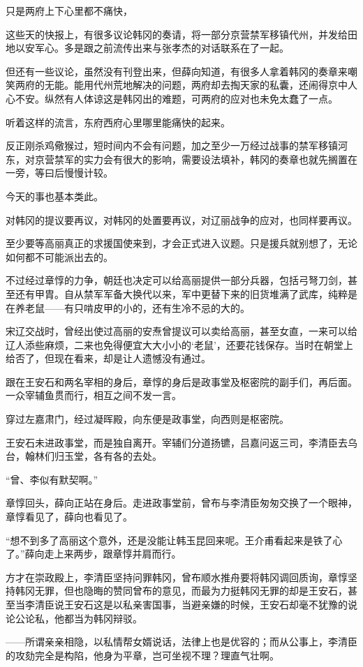 只是两府上下心里都不痛快，

这些天的快报上，有很多议论韩冈的奏请，将一部分京营禁军移镇代州，并发给田地以安军心。多是跟之前流传出来与张孝杰的对话联系在了一起。

但还有一些议论，虽然没有刊登出来，但薛向知道，有很多人拿着韩冈的奏章来嘲笑两府的无能。能用代州荒地解决的问题，两府却去掏天家的私囊，还闹得京中人心不安。纵然有人体谅这是韩冈出的难题，可两府的应对也未免太蠢了一点。

听着这样的流言，东府西府心里哪里能痛快的起来。

反正刚杀鸡儆猴过，短时间内不会有问题，加之至少一万经过战事的禁军移镇河东，对京营禁军的实力会有很大的影响，需要设法填补，韩冈的奏章也就先搁置在一旁，等曰后慢慢计较。

今天的事也基本类此。

对韩冈的提议要再议，对韩冈的处置要再议，对辽丽战争的应对，也同样要再议。

至少要等高丽真正的求援国使来到，才会正式进入议题。只是援兵就别想了，无论如何都不可能派出去的。

不过经过章惇的力争，朝廷也决定可以给高丽提供一部分兵器，包括弓弩刀剑，甚至还有甲胄。自从禁军军备大换代以来，军中更替下来的旧货堆满了武库，纯粹是在养老鼠——有只啃皮甲的小的，还有生冷不忌的大的。

宋辽交战时，曾经出使过高丽的安焘曾提议可以卖给高丽，甚至女直，一来可以给辽人添些麻烦，二来也免得便宜大大小小的‘老鼠’，还要花钱保存。当时在朝堂上给否了，但现在看来，却是让人遗憾没有通过。

跟在王安石和两名宰相的身后，章惇的身后是政事堂及枢密院的副手们，再后面。一众宰辅鱼贯而行，相互之间不发一言。

穿过左嘉肃门，经过凝晖殿，向东便是政事堂，向西则是枢密院。

王安石未进政事堂，而是独自离开。宰辅们分道扬镳，吕嘉问返三司，李清臣去乌台，翰林们归玉堂，各有各的去处。

“曾、李似有默契啊。”

章惇回头，薛向正站在身后。走进政事堂前，曾布与李清臣匆匆交换了一个眼神，章惇看见了，薛向也看见了。

“想不到多了高丽这个意外，还是没能让韩玉昆回来呢。王介甫看起来是铁了心了。”薛向走上来两步，跟章惇并肩而行。

方才在崇政殿上，李清臣坚持问罪韩冈，曾布顺水推舟要将韩冈调回质询，章惇坚持韩冈无罪，但也隐晦的赞同曾布的意见，而最为力挺韩冈无罪的却是王安石，甚至当李清臣说王安石这是以私亲害国事，当避亲嫌的时候，王安石却毫不犹豫的说论公论私，他都当为韩冈辩驳。

——所谓亲亲相隐，以私情帮女婿说话，法律上也是优容的；而从公事上，李清臣的攻劾完全是构陷，他身为平章，岂可坐视不理？理直气壮啊。

